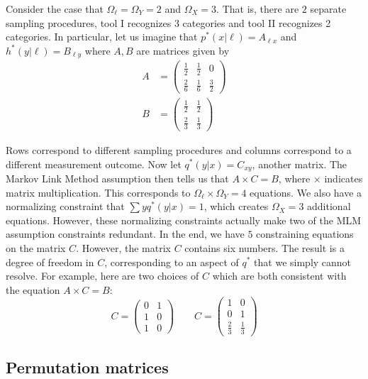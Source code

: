 Consider the case that $\Omega_\ell = \Omega_Y = 2$ and $\Omega_X=3$.  That is, there are $2$ separate sampling procedures, tool I recognizes 3 categories and tool II recognizes 2 categories.  In particular, let us imagine that $p^*(x|\ell)=A_{\ell x}$ and $h^*(y|\ell)=B_{\ell y}$ where $A,B$ are matrices given by 
%
\begin{align*}
A&=\left(\begin{array}{ccc}
\frac{1}{2} & \frac{1}{2} & 0\\
\frac{2}{6} & \frac{1}{6} & \frac{3}{2}
\end{array}\right) \\
B&=\left(\begin{array}{cc}
\frac{1}{2} & \frac{1}{2}\\
\frac{2}{3} & \frac{1}{3}
\end{array}\right)
\end{align*}

Rows correspond to different sampling procedures and columns correspond to a different measurement outcome.  Now let $q^*(y|x)=C_{x y}$, another matrix.  The Markov Link Method assumption then tells us that $A\times C=B$, where $\times$ indicates matrix multiplication.  This corresponds to $\Omega_\ell \times \Omega_Y = 4$ equations.  We also have a normalizing constraint that $\sum y q^*(y|x)=1$, which creates $\Omega_X=3$ additional equations.  However, these normalizing constraints actually make two of the MLM assumption constraints redundant.  In the end, we have $5$ constraining equations on the matrix $C$.  However, the matrix $C$ contains six numbers.  The result is a degree of freedom in $C$, corresponding to an aspect of $q^*$ that we simply cannot resolve.  For example, here are two choices of $C$ which are both consistent with the equation $A\times C=B$:
\[
C=\left(\begin{array}{cc}
0 & 1\\
1 & 0\\
1 & 0
\end{array}\right)\qquad C=\left(\begin{array}{cc}
1 & 0\\
0 & 1\\
\frac{2}{3} & \frac{1}{3}
\end{array}\right)
\]



\subsection{Permutation matrices}


